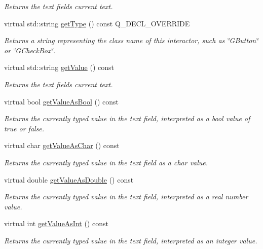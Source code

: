 \begin{DoxyCompactItemize}
\begin{DoxyCompactList}\small\item\em Returns the text field\textquotesingle{}s current text. \end{DoxyCompactList}\item 
virtual std\+::string \mbox{\hyperlink{classGTextField_a9896d58fcfebbf1025aeeb5b8b9ede80}{get\+Type}} () const Q\+\_\+\+D\+E\+C\+L\+\_\+\+O\+V\+E\+R\+R\+I\+DE
\begin{DoxyCompactList}\small\item\em Returns a string representing the class name of this interactor, such as \char`\"{}\+G\+Button\char`\"{} or \char`\"{}\+G\+Check\+Box\char`\"{}. \end{DoxyCompactList}\item 
virtual std\+::string \mbox{\hyperlink{classGTextField_a2a03038d2e299f486e55dc72778f7086}{get\+Value}} () const
\begin{DoxyCompactList}\small\item\em Returns the text field\textquotesingle{}s current text. \end{DoxyCompactList}\item 
virtual bool \mbox{\hyperlink{classGTextField_a8190c918ce29007223898c9d511b17ee}{get\+Value\+As\+Bool}} () const
\begin{DoxyCompactList}\small\item\em Returns the currently typed value in the text field, interpreted as a bool value of true or false. \end{DoxyCompactList}\item 
virtual char \mbox{\hyperlink{classGTextField_a562f514fc055aaa37ca3145fc7abde8e}{get\+Value\+As\+Char}} () const
\begin{DoxyCompactList}\small\item\em Returns the currently typed value in the text field as a char value. \end{DoxyCompactList}\item 
virtual double \mbox{\hyperlink{classGTextField_aab9a19edbd1548d557721e0b695295f8}{get\+Value\+As\+Double}} () const
\begin{DoxyCompactList}\small\item\em Returns the currently typed value in the text field, interpreted as a real number value. \end{DoxyCompactList}\item 
virtual int \mbox{\hyperlink{classGTextField_a5e50caa202955b726a44a1dfbc6f7818}{get\+Value\+As\+Int}} () const
\begin{DoxyCompactList}\small\item\em Returns the currently typed value in the text field, interpreted as an integer value. \end{DoxyCompactList}\item 

\end{DoxyCompactItemize}
